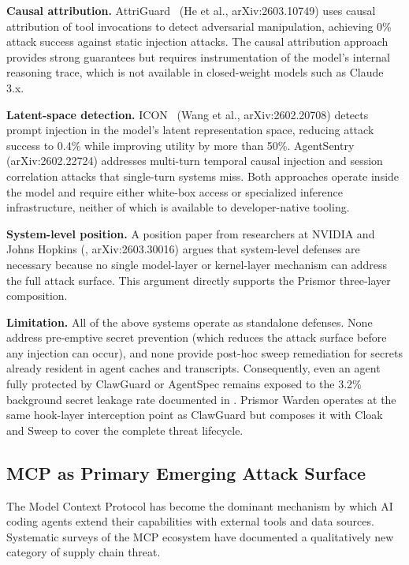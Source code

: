 \documentclass[11pt,letterpaper]{article}
\begin{document}
\textbf{Causal attribution.}
AttriGuard~\cite{he2026attriguard} (He et al., arXiv:2603.10749) uses causal
attribution of tool invocations to detect adversarial manipulation, achieving 0\%
attack success against static injection attacks.
The causal attribution approach provides strong guarantees but requires
instrumentation of the model's internal reasoning trace, which is not available
in closed-weight models such as Claude 3.x.

\textbf{Latent-space detection.}
ICON~\cite{wang2026icon} (Wang et al., arXiv:2602.20708) detects prompt injection
in the model's latent representation space, reducing attack success to 0.4\% while
improving utility by more than 50\%.
AgentSentry~\cite{authors2026agentsentry} (arXiv:2602.22724) addresses multi-turn
temporal causal injection and session correlation attacks that single-turn systems
miss.
Both approaches operate inside the model and require either white-box access or
specialized inference infrastructure, neither of which is available to
developer-native tooling.

\textbf{System-level position.}
A position paper from researchers at NVIDIA and Johns Hopkins
(\cite{research2026architecting}, arXiv:2603.30016) argues that system-level defenses are
necessary because no single model-layer or kernel-layer mechanism can address the
full attack surface.
This argument directly supports the Prismor three-layer composition.

\textbf{Limitation.}
All of the above systems operate as standalone defenses.
None address pre-emptive secret prevention (which reduces the attack surface
before any injection can occur), and none provide post-hoc sweep remediation for
secrets already resident in agent caches and transcripts.
Consequently, even an agent fully protected by ClawGuard or AgentSpec remains
exposed to the 3.2\% background secret leakage rate documented in
\cite{gitguardian2026state}.
Prismor Warden operates at the same hook-layer interception point as ClawGuard
but composes it with Cloak and Sweep to cover the complete threat lifecycle.

\subsection{MCP as Primary Emerging Attack Surface}
\label{subsec:mcp}

The Model Context Protocol has become the dominant mechanism by which AI coding
agents extend their capabilities with external tools and data sources.
Systematic surveys of the MCP ecosystem have documented a qualitatively new
category of supply chain threat.
\end{document}
